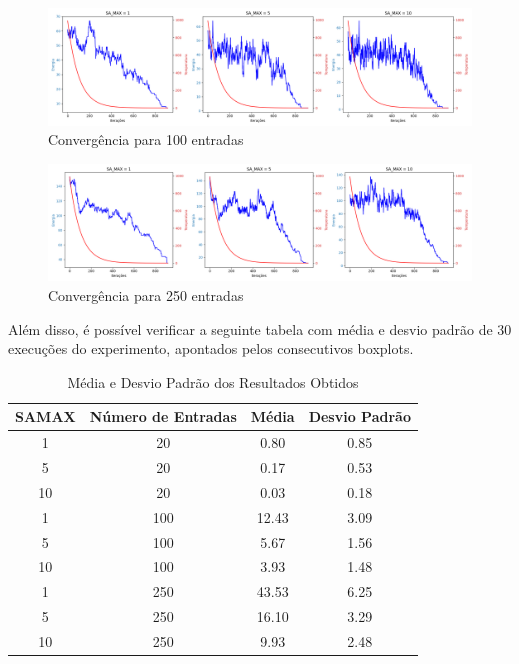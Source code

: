 \documentclass[12pt]{article}
\begin{document}
\begin{figure}[H]
  \centering
  \includegraphics[width=.9\textwidth]{imgs/melhores_sa_100.png}
  \caption{Convergência para 100 entradas}
  \label{fig:convergencia100}
   \end{figure}

\begin{figure}[H]
  \centering
  \includegraphics[width=.9\textwidth]{imgs/melhores_sa_250.png}
  \caption{Convergência para 250 entradas}
  \label{fig:convergencia250}
  \end{figure}


Além disso, é possível verificar a seguinte tabela com média e desvio padrão de 30 execuções do experimento, apontados pelos consecutivos boxplots.

\begin{table}[H]
\centering
\caption{Média e Desvio Padrão dos Resultados Obtidos}
\begin{tabular}{|c|c|c|c|}
\hline
\textbf{SAMAX} & \textbf{Número de Entradas} & \textbf{Média} & \textbf{Desvio Padrão} \\ \hline
1   & 20 & 0.80 & 0.85 \\ \hline
5   & 20 & 0.17 & 0.53 \\ \hline
10  & 20 & 0.03 & 0.18 \\ \hline
1   & 100 & 12.43 & 3.09 \\ \hline
5   & 100 & 5.67 & 1.56 \\ \hline
10  & 100 & 3.93 & 1.48 \\ \hline
1   & 250 & 43.53 & 6.25 \\ \hline
5   & 250 & 16.10 & 3.29 \\ \hline
10  & 250 & 9.93 & 2.48 \\ \hline

\end{tabular}
\label{tab:resultados}
\end{table}
\end{document}
